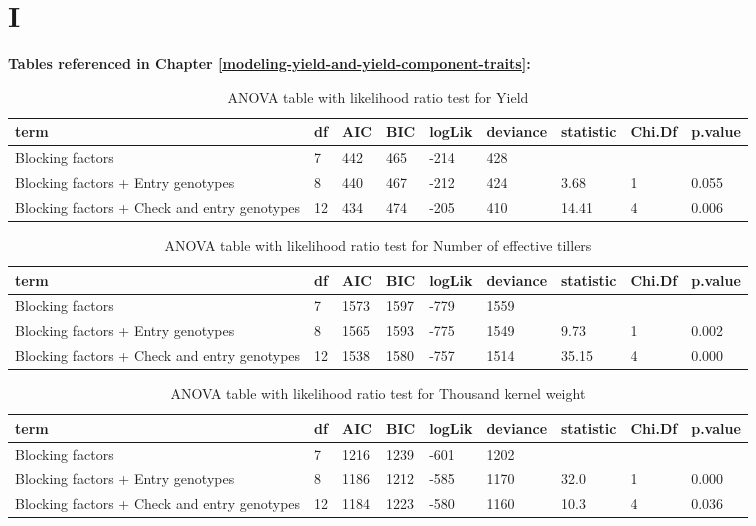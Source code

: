 \documentclass[12pt,oneside]{dukestatscithesis} %
\begin{document}
\appendix

\hypertarget{i}{%
\chapter{I}\label{i}}

\textbf{Tables referenced in Chapter \ref{modeling-yield-and-yield-component-traits}:}
\begin{table}[H]

\caption{\label{tab:unnamed-chunk-3}\label{tab:lrt-yield}ANOVA table with likelihood ratio test for Yield}
\centering
\begin{tabular}[t]{>{\raggedright\arraybackslash}p{3.5cm}llllllll}
\toprule
term & df & AIC & BIC & logLik & deviance & statistic & Chi.Df & p.value\\
\midrule
Blocking factors & 7 & 442 & 465 & -214 & 428 &  &  & \\
Blocking factors + Entry genotypes & 8 & 440 & 467 & -212 & 424 & 3.68 & 1 & 0.055\\
Blocking factors + Check and entry genotypes & 12 & 434 & 474 & -205 & 410 & 14.41 & 4 & 0.006\\
\bottomrule
\end{tabular}
\end{table}
\begin{table}[H]

\caption{\label{tab:unnamed-chunk-3}\label{tab:lrt-netill}ANOVA table with likelihood ratio test for Number of effective tillers}
\centering
\begin{tabular}[t]{>{\raggedright\arraybackslash}p{3.5cm}llllllll}
\toprule
term & df & AIC & BIC & logLik & deviance & statistic & Chi.Df & p.value\\
\midrule
Blocking factors & 7 & 1573 & 1597 & -779 & 1559 &  &  & \\
Blocking factors + Entry genotypes & 8 & 1565 & 1593 & -775 & 1549 & 9.73 & 1 & 0.002\\
Blocking factors + Check and entry genotypes & 12 & 1538 & 1580 & -757 & 1514 & 35.15 & 4 & 0.000\\
\bottomrule
\end{tabular}
\end{table}
\begin{table}[H]

\caption{\label{tab:unnamed-chunk-3}\label{tab:lrt-tkw}ANOVA table with likelihood ratio test for Thousand kernel weight}
\centering
\begin{tabular}[t]{>{\raggedright\arraybackslash}p{3.5cm}llllllll}
\toprule
term & df & AIC & BIC & logLik & deviance & statistic & Chi.Df & p.value\\
\midrule
Blocking factors & 7 & 1216 & 1239 & -601 & 1202 &  &  & \\
Blocking factors + Entry genotypes & 8 & 1186 & 1212 & -585 & 1170 & 32.0 & 1 & 0.000\\
Blocking factors + Check and entry genotypes & 12 & 1184 & 1223 & -580 & 1160 & 10.3 & 4 & 0.036\\
\bottomrule
\end{tabular}
\end{table}
\end{document}
